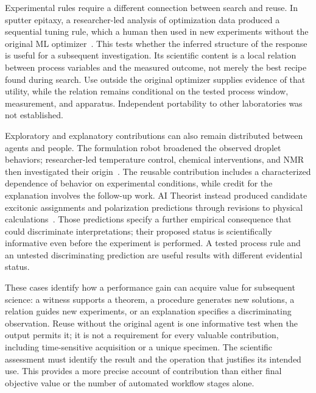 Experimental rules require a different connection between search and reuse. In sputter epitaxy, a researcher-led analysis of optimization data produced a sequential tuning rule, which a human then used in new experiments without the original ML optimizer~\cite{asd0999}. This tests whether the inferred structure of the response is useful for a subsequent investigation. Its scientific content is a local relation between process variables and the measured outcome, not merely the best recipe found during search. Use outside the original optimizer supplies evidence of that utility, while the relation remains conditional on the tested process window, measurement, and apparatus. Independent portability to other laboratories was not established.

Exploratory and explanatory contributions can also remain distributed between agents and people. The formulation robot broadened the observed droplet behaviors; researcher-led temperature control, chemical interventions, and NMR then investigated their origin~\cite{asd0575}. The reusable contribution includes a characterized dependence of behavior on experimental conditions, while credit for the explanation involves the follow-up work. AI Theorist instead produced candidate excitonic assignments and polarization predictions through revisions to physical calculations~\cite{asd1081}. Those predictions specify a further empirical consequence that could discriminate interpretations; their proposed status is scientifically informative even before the experiment is performed. A tested process rule and an untested discriminating prediction are useful results with different evidential status.

These cases identify how a performance gain can acquire value for subsequent science: a witness supports a theorem, a procedure generates new solutions, a relation guides new experiments, or an explanation specifies a discriminating observation. Reuse without the original agent is one informative test when the output permits it; it is not a requirement for every valuable contribution, including time-sensitive acquisition or a unique specimen. The scientific assessment must identify the result and the operation that justifies its intended use. This provides a more precise account of contribution than either final objective value or the number of automated workflow stages alone.

